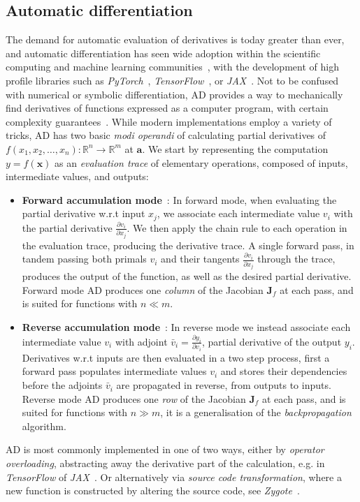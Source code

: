 \subsection{Automatic differentiation}
\label{subsec:autodiff}
The demand for automatic evaluation of derivatives is today greater than ever, and automatic differentiation has seen wide adoption within the scientific computing and machine learning communities~\cite{lyu2013automatic, tamayo2018automatic, baydin2018automatic}, with the development of high profile libraries such as \emph{PyTorch}~\cite{paszke2017automatic}, \emph{TensorFlow}~\cite{abadi2016tensorflow}, or \emph{JAX}~\cite{jax2018github}. Not to be confused with numerical or symbolic differentiation, AD provides a way to mechanically find derivatives of functions expressed as a computer program, with certain complexity guarantees~\cite{barak2016history}. While modern implementations employ a variety of tricks, AD has two basic \emph{modi operandi} of calculating partial derivatives of $f(x_1, x_2, \ldots, x_n): \mathbb{R}^n \rightarrow \mathbb{R}^m$ at $\mathbf{a}$. We start by representing the computation $y = f(\mathbf{x})$ as an \emph{evaluation trace} of elementary operations, composed of inputs, intermediate values, and outputs:
\begin{itemize}
	\item \textbf{Forward accumulation mode}~\cite{wengert1964simple}:  In forward mode, when evaluating the partial derivative w.r.t input $x_j$, we associate each intermediate value $v_i$ with the partial derivative $\frac{\partial v_i}{\partial x_j}$. We then apply the chain rule to each operation in the evaluation trace, producing the derivative trace. A single forward pass, in tandem passing both primals $v_i$ and their tangents $\frac{\partial v_i}{\partial x_j}$ through the trace, produces the output of the function, as well as the desired partial derivative. Forward mode AD produces one \emph{column} of the Jacobian $\textbf{J}_f$ at each pass, and is suited for functions with $n \ll m$.
	
	\item \textbf{Reverse accumulation mode}~\cite{speelpenning1980compiling}: In reverse mode we instead associate each intermediate value $v_i$ with adjoint $\bar{v}_i = \frac{\partial y_i}{\partial v_i}$, partial derivative of the output $y_i$. Derivatives w.r.t inputs are then evaluated in a two step process, first a forward pass populates intermediate values $v_i$ and stores their dependencies before the adjoints $\bar{v}_i$ are propagated in reverse, from outputs to inputs. Reverse mode AD produces one \emph{row} of the Jacobian $\textbf{J}_f$ at each pass, and is suited for functions with $n \gg m$, it is a generalisation of the \emph{backpropagation} algorithm.
\end{itemize}
AD is most commonly implemented in one of two ways, either by \emph{operator overloading}, abstracting away the derivative part of the calculation, e.g. in \emph{TensorFlow} of \emph{JAX}~\cite{abadi2016tensorflow, jax2018github}. Or alternatively via \emph{source code transformation}, where a new function is constructed by altering the source code, see \emph{Zygote}~\cite{innes2018don}.

